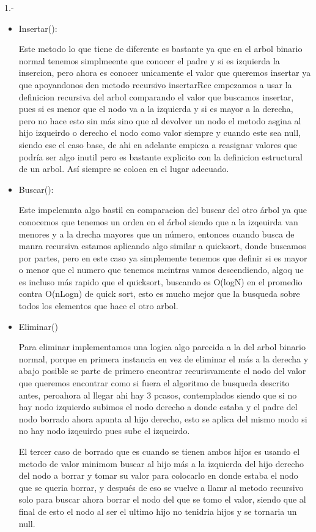 \begin{respuesta}{1.-}
    \begin{itemize}
        \item Insertar():
        
        Este metodo lo que tiene de diferente es bastante ya que en el arbol binario normal tenemos simplmeente que conocer el padre y si es izquierda la insercion, pero ahora es conocer unicamente el valor que queremos insertar ya que apoyandonos den metodo recursivo insertarRec empezamos a usar la definicion recursiva del arbol comparando el valor que buscamos insertar, pues si es menor que el nodo va a la izquierda y si es mayor a la derecha, pero no hace esto sin más sino que al devolver un nodo el metodo asgina al hijo izqueirdo o derecho el nodo como valor siempre y cuando este sea null, siendo ese el caso base, de ahi en adelante empieza a reasignar valores que podría ser algo inutil pero es bastante explicito con la definicion estructural de un arbol. Así siempre se coloca en el lugar adecuado.
        \item Buscar():
        
        Este impelemnta algo bastil en comparacion del buscar del otro árbol ya que conocemos que tenemos un orden en el árbol siendo que a la izqeuirda van menores y a la drecha mayores que un número, entonces cuando busca de manra recursiva estamos aplicando algo similar a quicksort, donde buscamos por partes, pero en este caso ya simplemente tenemos que definir si es mayor o menor que el numero que tenemos meintras vamos descendiendo, algoq ue es incluso más rapido que el quicksort, buscando es O(logN) en el promedio contra O(nLogn) de quick sort, esto es mucho mejor que la busqueda sobre todos los elementos que hace el otro arbol.
        \item Eliminar()

        Para eliminar implementamos una logica algo parecida a la del arbol binario normal, porque en primera instancia en vez de eliminar el más a la derecha y abajo posible se parte de primero encontrar recurisvamente el nodo del valor que queremos encontrar como si fuera el algoritmo de busqueda descrito antes, peroahora al llegar ahi hay 3 pcasos, contemplados siendo que si no hay nodo izquierdo subimos el nodo derecho a donde estaba y el padre del nodo borrado ahora apunta al hijo derecho, esto se aplica del mismo modo si no hay nodo izqeuirdo pues sube el izqueirdo.

        El tercer caso de borrado que es cuando se tienen ambos hijos es usando el metodo de valor minimom buscar al hijo más a la izquierda del hijo derecho del nodo a borrar y tomar su valor para colocarlo en donde estaba el nodo que se queria borrar, y después de eso se vuelve a llamr al metodo recursivo solo para buscar ahora borrar el nodo del que se tomo el valor, siendo que al final de esto el nodo al ser el ultimo hijo no tenidria hijos y se tornaria un null.
        
    \end{itemize}
\end{respuesta}
